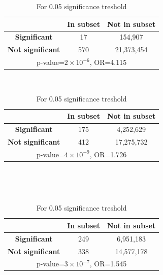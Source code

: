 \begin {table}
    \centering
    \caption{Contingency tables}
    \begin{subtable}{1\linewidth}
        \centering
        \caption{For Bonferroni treshold, $\alpha = 2.322 \times 10^{-9}$}
            \begin{tabular}{c c c} 
                \hline
                &  \textbf{In subset} & \textbf{Not in subset} \\
                 \hline
                 \hline
                 \textbf{Significant} & 17 & 154,907 \\ 
                 \textbf{Not significant} & 570 & 21,373,454 \\
                 \hline
                 \multicolumn{3}{c}{p-value=$2\times 10^{-6}$, OR=4.115 } \\
                 \hline
            \end{tabular}
        \label{table:cont1}
    \end{subtable}
    ~\vspace*{1 cm}

    \begin{subtable}{1\linewidth}
        \centering
        \caption{For Benjamini-Hochberg treshold = $9.877\times10^{-3}$}
        \begin{tabular}{c c c} 
            \hline
            &  \textbf{In subset} & \textbf{Not in subset} \\
             \hline
             \hline
             \textbf{Significant} & 175 & 4,252,629 \\ 
             \textbf{Not significant} & 412 & 17,275,732 \\
             \hline
             \multicolumn{3}{c}{p-value=$4 \times 10^{-9}$, OR=1.726}\\
             \hline
        \end{tabular}
    \label{table:cont2}
    \end{subtable}
    ~\vspace*{1 cm}

    \begin{subtable}{1\linewidth}\
        \centering
        \caption{For 0.05 significance treshold}
        \begin{tabular}{c c c} 
            \hline
            &  \textbf{In subset} & \textbf{Not in subset} \\
             \hline
             \hline
             \textbf{Significant} & 249 & 6,951,183 \\ 
             \textbf{Not significant} & 338 & 14,577,178 \\
             \hline
             \multicolumn{3}{c}{p-value=$3 \times 10^{-7}$, OR=1.545}\\
             \hline
        \end{tabular}
    \label{table:cont3}
    \end{subtable}
    ~\vspace*{1 cm}


\end{table}
